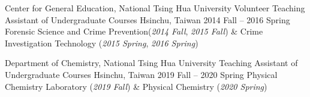 \begin{cventries}
\cventry
{Center for General Education, National Tsing Hua University}
{Volunteer Teaching Assistant of Undergraduate Courses}
{Hsinchu, Taiwan}
{2014 Fall -- 2016 Spring}
{Forensic Science and Crime Prevention(\textit{2014 Fall}, \textit{2015 Fall}) \& Crime Investigation Technology (\textit{2015 Spring}, \textit{2016 Spring})}

\cventry
{Department of Chemistry, National Tsing Hua University}
{Teaching Assistant of Undergraduate Courses}
{Hsinchu, Taiwan}
{2019 Fall -- 2020 Spring}
{Physical Chemistry Laboratory  (\textit{2019 Fall}) \& Physical Chemistry  (\textit{2020 Spring})}
\end{cventries}